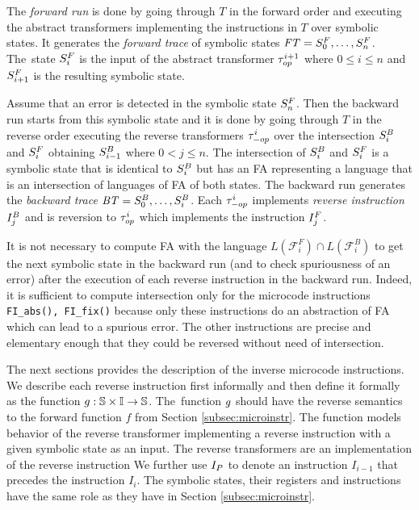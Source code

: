 The \emph{forward run} is done by going through $T$ in the forward order
and executing the abstract transformers implementing the instructions in $T$
over symbolic states.
It generates the \emph{forward trace} of symbolic states $\mathit{FT}=S^{F}_0, \ldots, S^{F}_n$.
The~state $S^{F}_{i}$ is the input of the abstract transformer $\tau_{op}^{i+1}$
where $ 0 \leq i \leq n$ and $S^{F}_{i+1}$ is the resulting symbolic state.

Assume that an error is detected in the symbolic state $S^{F}_{n}$.
Then the backward run starts from this symbolic state
and it is done by going through $T$ in the reverse order
executing the reverse transformers $\tau_{-op}^{i}$
over the intersection $S^{B}_{i}$ and $S^{F}_{i}$ obtaining $S^{B}_{i-1}$ where $0 < j \leq n$.
The intersection of $S^{B}_{i}$ and $S^{F}_{i}$ is a symbolic state that is identical
to $S^{B}_{i}$ but has an FA representing a language
that is an intersection of languages of FA of both states.
The backward run generates the \emph{backward trace} $\mathit{BT}=S^{B}_0, \ldots, S^{B}_i$.
Each $\tau_{-op}^{i}$ implements \emph{reverse instruction} $I^{B}_{j}$
and is reversion to $\tau_{op}^{i}$ which implements the instruction $I_{j}^{F}$.

It is not necessary to compute FA with the language
$L(\mathcal{F}_i^F) \cap L(\mathcal{F}_i^B)$ to get the next
symbolic state in the backward run (and to check spuriousness of an error)
after the execution of each reverse instruction in the backward run.
Indeed, it is sufficient to compute intersection only for
the microcode instructions {\tt FI\_abs(), FI\_fix()}
because only these instructions do an abstraction of FA
which can lead to a spurious error.
The other instructions are precise and elementary enough
that they could be reversed without need of intersection.

The next sections provides the description of the inverse microcode instructions.
We describe each reverse instruction first informally
and then define it formally as the function $g: \mathbb{S} \times \mathbb{I} \rightarrow \mathbb{S}$.
The~function $g$ should have the reverse semantics
to the forward function $f$ from Section \ref{subsec:microinstr}.
The function models behavior of the reverse transformer
implementing a reverse instruction with a given symbolic state as an input.
The reverse transformers are an implementation of the reverse instruction 
We further use $I_{P}$ to denote an instruction $I_{i-1}$
that precedes the instruction $I_{i}$.
The symbolic states, their registers and instructions have the
same role as they have in Section \ref{subsec:microinstr}.

